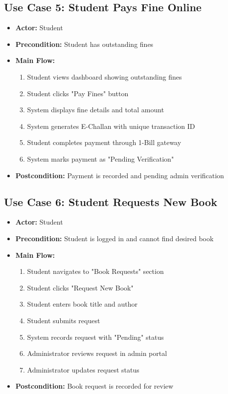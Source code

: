 \documentclass[12pt,a4paper]{report}
\begin{document}
\subsection{Use Case 5: Student Pays Fine Online}

\begin{itemize}
    \item \textbf{Actor:} Student
    \item \textbf{Precondition:} Student has outstanding fines
    \item \textbf{Main Flow:}
    \begin{enumerate}
        \item Student views dashboard showing outstanding fines
        \item Student clicks "Pay Fines" button
        \item System displays fine details and total amount
        \item System generates E-Challan with unique transaction ID
        \item Student completes payment through 1-Bill gateway
        \item System marks payment as "Pending Verification"
    \end{enumerate}
    \item \textbf{Postcondition:} Payment is recorded and pending admin verification
\end{itemize}

\subsection{Use Case 6: Student Requests New Book}

\begin{itemize}
    \item \textbf{Actor:} Student
    \item \textbf{Precondition:} Student is logged in and cannot find desired book
    \item \textbf{Main Flow:}
    \begin{enumerate}
        \item Student navigates to "Book Requests" section
        \item Student clicks "Request New Book"
        \item Student enters book title and author
        \item Student submits request
        \item System records request with "Pending" status
        \item Administrator reviews request in admin portal
        \item Administrator updates request status
    \end{enumerate}
    \item \textbf{Postcondition:} Book request is recorded for review
\end{itemize}
\end{document}
